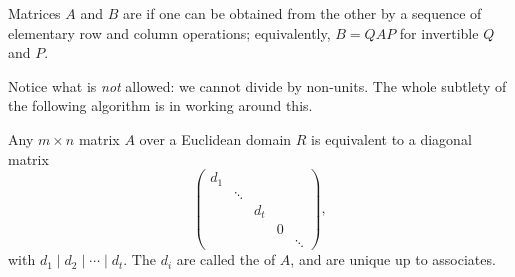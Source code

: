 \begin{definition}[Equivalence]
	Matrices $A$ and $B$ are  if one can be obtained from the other by a sequence of elementary row and column operations; equivalently, $B = QAP$ for invertible $Q$ and $P$.
\end{definition}

Notice what is \emph{not} allowed: we cannot divide by non-units. The whole subtlety of the following algorithm is in working around this.

\begin{theorem}
	Any $m \times n$ matrix $A$ over a Euclidean domain $R$ is equivalent to a diagonal matrix
	$$
	\begin{pmatrix}
		d_1 & & & \\
		& \ddots & & \\
		& & d_t & \\
		& & & 0 \\
		& & & & \ddots
	\end{pmatrix},
	$$
	with $d_1 \mid d_2 \mid \cdots \mid d_t$. The $d_i$ are called the  of $A$, and are unique up to associates.
\end{theorem}
